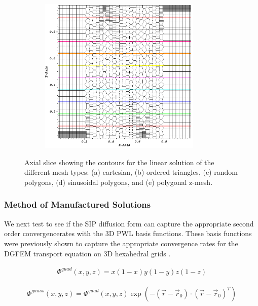\begin{figure}
\begin{subfigure}[b]{0.45\textwidth}
		\includegraphics[width=0.85\textwidth]{figures/sec_DSA/SIP_z_poly_lin_contour.png}
		\caption{}
	\end{subfigure}
\caption{Axial slice showing the contours for the linear solution of the different mesh types: (a) cartesian, (b) ordered triangles, (c) random polygons, (d) sinusoidal polygons, and (e) polygonal z-mesh.}
\label{fig::SIP_linear_sol}
\end{figure}

\subsubsection{Method of Manufactured Solutions}
\label{sec::DSA_Results_SIP_MMS}

We next test to see if the SIP diffusion form can capture the appropriate second order convergencerates with the 3D PWL basis functions. These basis functions were previously shown to capture the appropriate convergence rates for the DGFEM transport equation on 3D hexahedral grids \cite{bailey2008phd}.

\begin{equation}
\label{eq::SIP_quad_mms_solution}
\begin{aligned}
\Phi^{quad} (x,y,z) = x(1-x)y(1-y)z(1-z) 
\end{aligned}
\end{equation}

\begin{equation}
\label{eq::SIP_gauss_mms_solution}
\begin{aligned}
\Phi^{gauss} (x,y,z) = \Phi^{quad} (x,y,z) \exp(- (\vec{r} - \vec{r}_0) \cdot (\vec{r} - \vec{r}_0)^{T}  )
\end{aligned}
\end{equation}


